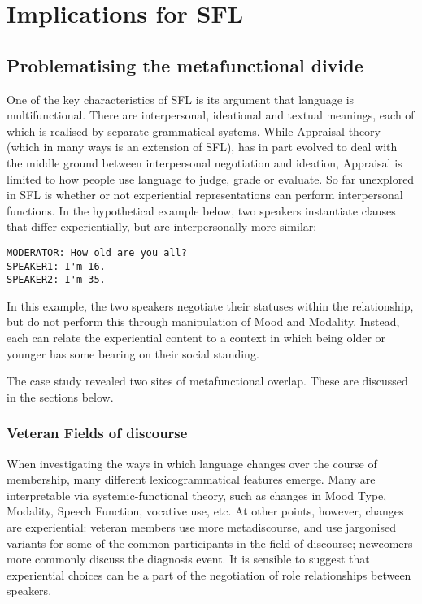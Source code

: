 \section{Implications for SFL} \lipsum \lipsum



\subsection{Problematising the metafunctional divide}

One of the key characteristics of \gls{SFL} is its argument that language is multifunctional. There are interpersonal, ideational and textual meanings, each of which is realised by separate grammatical systems. While Appraisal theory (which in many ways is an extension of \gls{SFL}), has in part evolved to deal with the middle ground between interpersonal negotiation and ideation, Appraisal is limited to how people use language to judge, grade or evaluate. So far unexplored in \gls{SFL} is whether or not experiential representations can perform interpersonal functions. In the hypothetical example below, two speakers instantiate clauses that differ experientially, but are interpersonally more similar:

\begin{verbatim}
MODERATOR: How old are you all?
SPEAKER1: I'm 16.
SPEAKER2: I'm 35.
\end{verbatim}

\noindent In this example, the two speakers negotiate their statuses within the relationship, but do not perform this through manipulation of Mood and Modality. Instead, each can relate the experiential content to a context in which being older or younger has some bearing on their social standing.

The case study revealed two sites of metafunctional overlap. These are discussed in the sections below.

\subsubsection{Veteran Fields of discourse}

When investigating the ways in which language changes over the course of membership, many different lexicogrammatical features emerge. Many are interpretable via systemic-functional theory, such as changes in Mood Type, Modality, Speech Function, vocative use, etc. At other points, however, changes are experiential: veteran members use more metadiscourse, and use jargonised variants for some of the common participants in the field of discourse; newcomers more commonly discuss the diagnosis event. It is sensible to suggest that experiential choices can be a part of the negotiation of role relationships between speakers.

